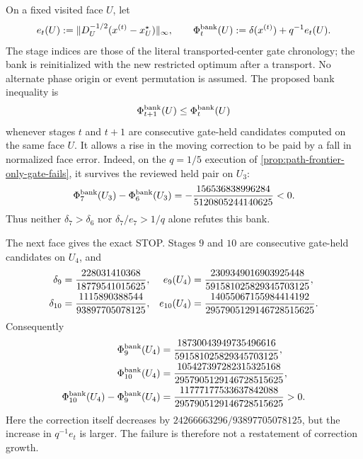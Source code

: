 \begin{proposition}
\label{prop:path-correction-error-bank-potential-fails}
On a fixed visited face $U$, let
\begin{equation}
 e_t(U):=\lVert D_U^{-1/2}(x^{(t)}-x_U^\star)\rVert_\infty,
 \qquad
 \Phi_t^{\rm bank}(U):=\delta(x^{(t)})+q^{-1}e_t(U).
 \label{eq:path-correction-error-bank}
\end{equation}
The stage indices are those of the literal transported-center gate chronology;
the bank is reinitialized with the new restricted optimum after a transport.
No alternate phase origin or event permutation is assumed.
The proposed bank inequality is
\begin{equation*}
 \Phi_{t+1}^{\rm bank}(U)\leq \Phi_t^{\rm bank}(U)
\end{equation*}
whenever stages $t$ and $t+1$ are consecutive gate-held candidates computed
on the same face $U$.  It allows a rise in the moving correction to be paid
by a fall in normalized face error.  Indeed, on the $q=1/5$ execution of
\cref{prop:path-frontier-only-gate-fails}, it survives the reviewed held pair
on $U_3$:
\begin{equation}
 \Phi_7^{\rm bank}(U_3)-\Phi_6^{\rm bank}(U_3)
 =-\frac{156536838996284}{5120805244140625}<0.
 \label{eq:path-correction-error-bank-stage-seven-pass}
\end{equation}
Thus neither $\delta_7>\delta_6$ nor $\delta_7/e_7>1/q$ alone refutes this
bank.

The next face gives the exact STOP.  Stages $9$ and $10$ are consecutive
gate-held candidates on $U_4$, and
\begin{align}
 \delta_9
 &=\frac{228031410368}{18779541015625},
 &e_9(U_4)
 &=\frac{2309349016903925448}{591581025829345703125},
 \notag\\
 \delta_{10}
 &=\frac{1115890388544}{93897705078125},
 &e_{10}(U_4)
 &=\frac{14055067155984414192}{2957905129146728515625}.
 \label{eq:path-correction-error-bank-components}
\end{align}
Consequently
\begin{equation}
 \begin{split}
 \Phi_9^{\rm bank}(U_4)
 &=\frac{18730043949735496616}{591581025829345703125},\\
 \Phi_{10}^{\rm bank}(U_4)
 &=\frac{105427397282315325168}{2957905129146728515625},\\
 \Phi_{10}^{\rm bank}(U_4)-\Phi_9^{\rm bank}(U_4)
 &=\frac{11777177533637842088}
         {2957905129146728515625}>0.
 \end{split}
 \label{eq:path-correction-error-bank-stage-ten-stop}
\end{equation}
Here the correction itself decreases by
$24266663296/93897705078125$, but the increase in $q^{-1}e_t$ is larger.
The failure is therefore not a restatement of correction growth.


\end{proposition}
